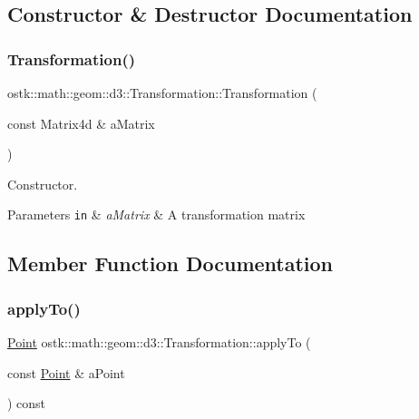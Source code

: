 \subsection{Constructor \& Destructor Documentation}
\mbox{\label{classostk_1_1math_1_1geom_1_1d3_1_1_transformation_a9823bcddddd66927b3039bf629f53dc6}} 
\subsubsection{\texorpdfstring{Transformation()}{Transformation()}}
{\footnotesize\ttfamily ostk\+::math\+::geom\+::d3\+::\+Transformation\+::\+Transformation (\begin{DoxyParamCaption}\item[{const Matrix4d \&}]{a\+Matrix }\end{DoxyParamCaption})}



Constructor. 


\begin{DoxyParams}[1]{Parameters}
\mbox{\tt in}  & {\em a\+Matrix} & A transformation matrix \\
\hline
\end{DoxyParams}


\subsection{Member Function Documentation}
\mbox{\label{classostk_1_1math_1_1geom_1_1d3_1_1_transformation_a03726747746fdfd6c4e788fd159f63fd}} 
\subsubsection{\texorpdfstring{apply\+To()}{applyTo()}\hspace{0.1cm}{\footnotesize\ttfamily [1/2]}}
{\footnotesize\ttfamily \hyperlink{classostk_1_1math_1_1geom_1_1d3_1_1objects_1_1_point}{Point} ostk\+::math\+::geom\+::d3\+::\+Transformation\+::apply\+To (\begin{DoxyParamCaption}\item[{const \hyperlink{classostk_1_1math_1_1geom_1_1d3_1_1objects_1_1_point}{Point} \&}]{a\+Point }\end{DoxyParamCaption}) const}

